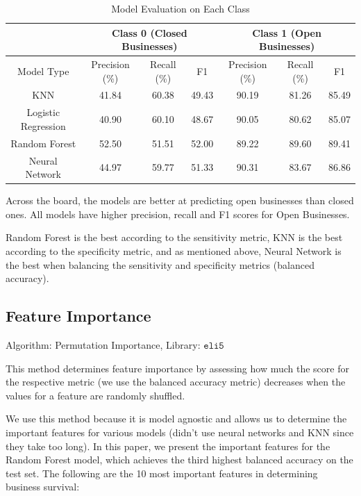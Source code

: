 \documentclass{article}
\begin{document}
\begin{table}[hbpt]
\centering
\begin{tabular}{ c|c|c|c|c|c|c }
 \hline
 ~& \multicolumn{3}{c|}{Class 0 (Closed Businesses)} & \multicolumn{3}{c}{Class 1 (Open Businesses)}  \\
 \hline
Model Type & Precision (\%) & Recall (\%) & F1  & Precision (\%) & Recall (\%) & F1 \\
 \hline
 KNN   & 41.84    &  60.38   &  49.43  &  90.19  &  81.26   &  85.49   \\
  
 \hline
 Logistic Regression & 40.90 & 60.10 & 48.67 & 90.05 & 80.62 & 85.07
 \\
  
 \hline
 Random Forest &  52.50 & 51.51 & 52.00 & 89.22  & 89.60 & 89.41
 \\

  \hline
 Neural Network & 44.97 & 59.77  & 51.33 & 90.31 & 83.67 & 86.86
 \\

 \hline

\end{tabular}
  \caption{Model Evaluation on Each Class} 
  \vspace{-2ex}
  \label{tab:table_class}
\end{table}

Across the board, the models are better at predicting open businesses than closed ones. All models have higher precision, recall and F1 scores for Open Businesses.

Random Forest is the best according to the sensitivity metric, KNN is the best according to the specificity metric, and as mentioned above, Neural Network is the best when balancing the sensitivity and specificity metrics (balanced accuracy).



\subsection{Feature Importance}
\label{FeatImp}
Algorithm: Permutation Importance,  Library: $\texttt{eli5}$

This method determines feature importance by assessing how much the score for the respective metric (we use the balanced accuracy metric) decreases when the values for a feature are randomly shuffled. 

We use this method because it is model agnostic and allows us to determine the important features for various models (didn't use neural networks and KNN since they take too long). In this paper, we present the important features for the Random Forest model, which achieves the third highest balanced accuracy on the test set. The following are the 10 most important features in determining business
survival:
\end{document}
